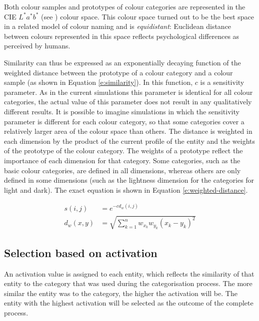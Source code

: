 Both colour samples and prototypes of colour categories are
represented in the CIE $L^*a^*b^*$ (see ) colour
space. This colour space turned out to be the best space in a related
model of colour naming \citep{lammens94computational} and is
\emph{equidistant}: Euclidean distance between colours represented in
this space reflects psychological differences as perceived by humans.

Similarity can thus be expressed as an exponentially decaying function
\citep{shepard87toward, gardenfors04conceptual} of the weighted
distance between the prototype of a colour category and a colour
sample (as shown in Equation \ref{e:similarity}). In this function,
$c$ is a sensitivity parameter. As in the current simulations this
parameter is identical for all colour categories, the actual value of
this parameter does not result in any qualitatively different
results. It is possible to imagine simulations in which the
sensitivity parameter is different for each colour category, so that some 
categories cover a relatively larger area of the
colour space than others. The distance is weighted in each dimension by the
product of the current profile of the entity and the weights of the
prototype of the colour category. The weights of a prototype reflect
the importance of each dimension for that category. Some categories,
such as the basic colour categories, are defined in all dimensions,
whereas others are only defined in some dimensions (such as the
lightness dimension for the categories for light and dark). The exact
equation is shown in Equation \ref{e:weighted-distance}.

\begin{align}
s(i,j) &= e^{-cd_w(i,j)}
\label{e:similarity} \\
d_w(x,y) &= \sqrt{\sum_{k=1}^n w_{x_k}w_{y_k} (x_k - y_k)^2}
\label{e:weighted-distance}
\end{align}

\subsection{Selection based on activation}

An activation value is assigned to each entity, which reflects the
similarity of that entity to the category that was used during the
categorisation process. The more similar the entity was to the
category, the higher the activation will be. The entity with the
highest activation will be selected as the outcome of the complete
process.

